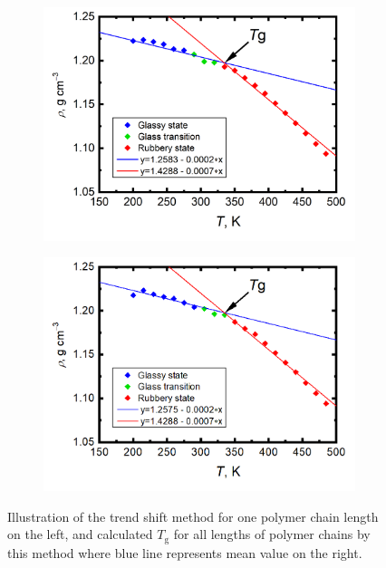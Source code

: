\begin{figure}[H]
	\begin{subfigure}{0.5\textwidth}
		\includegraphics[width=1.0\linewidth]{img/vypocet_tg.png} 
	\end{subfigure}
	\begin{subfigure}{0.5\textwidth}
		\includegraphics[width=1.0\linewidth]{img/tg_ukazka_30.png} 
	\end{subfigure}   	
	\vspace{-1cm}
	\caption{Illustration of the trend shift method for one polymer chain length on the left, and calculated $T_\mathrm{g}$ for all lengths of polymer chains by this method where blue line represents mean value on the right.}
	\label{fig:glass}
\end{figure}

